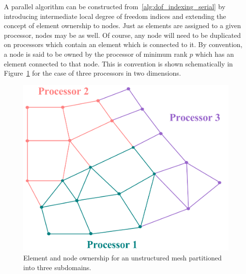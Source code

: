 A parallel algorithm can be constructed from~\ref{alg:dof_indexing_serial} by introducing intermediate local degree of freedom indices and extending the concept of element ownership to nodes.  Just as elements are assigned to a given processor, nodes may be as well.  Of course, any node will need to be duplicated on processors which contain an element which is connected to it.  By convention, a node is said to be owned by the processor of minimum rank $p$ which has an element connected to that node.  This is convention is shown schematically in Figure~\ref{fig:elem_node_ownership} for the case of three processors in two dimensions.
\begin{figure}[hbtp]
  \begin{center}
    \includegraphics[width=.8\textwidth]{figures/data_structures/dof_distribution}
    \caption{Element and node ownership for an unstructured mesh partitioned into three subdomains.\label{fig:elem_node_ownership}}
  \end{center}
\end{figure}

